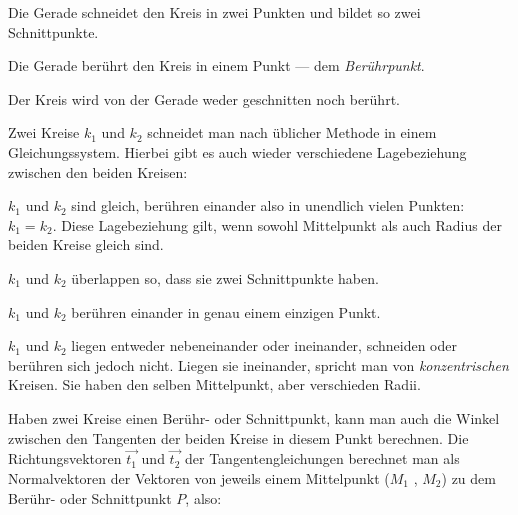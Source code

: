 \begin{enumerate}

\renewcommand{\theenumi}{\Alph{enumi}}


	Die Gerade schneidet den Kreis in zwei Punkten und bildet so zwei Schnittpunkte.


	Die Gerade ber\"{u}hrt den Kreis in einem Punkt --- dem \emph{Ber\"{u}hrpunkt}.


	Der Kreis wird von der Gerade weder geschnitten noch ber\"{u}hrt. 

\end{enumerate}


Zwei Kreise $k_{1}$ und $k_{2}$ schneidet man nach \"{u}blicher Methode in einem Gleichungssystem. Hierbei gibt es auch wieder verschiedene Lagebeziehung zwischen den beiden Kreisen:
\begin{enumerate}

\renewcommand{\theenumi}{\Alph{enumi}}


	$k_{1}$ und $k_{2}$ sind gleich, ber\"{u}hren einander also in unendlich vielen Punkten: $k_{1} = k_{2}$. Diese Lagebeziehung gilt, wenn sowohl Mittelpunkt als auch Radius der beiden Kreise gleich sind. 


	$k_{1}$ und $k_{2}$ \"{u}berlappen so, dass sie zwei Schnittpunkte haben.


	$k_{1}$ und $k_{2}$ ber\"{u}hren einander in genau einem einzigen Punkt.

\pagebreak


	$k_{1}$ und $k_{2}$ liegen entweder nebeneinander oder ineinander, schneiden oder ber\"{u}hren sich jedoch nicht. Liegen sie ineinander, spricht man von \emph{konzentrischen} Kreisen. Sie haben den selben Mittelpunkt, aber verschieden Radii.

\end{enumerate}

Haben zwei Kreise einen Ber\"{u}hr- oder Schnittpunkt, kann man auch die Winkel zwischen den Tangenten der beiden Kreise in diesem Punkt berechnen. Die Richtungsvektoren $\vec{t_{1}}$ und $\vec{t_{2}}$ der Tangentengleichungen berechnet man als Normalvektoren der Vektoren von jeweils einem Mittelpunkt ($M_{1}$ , $M_{2}$) zu dem Ber\"{u}hr- oder Schnittpunkt $P$, also:

